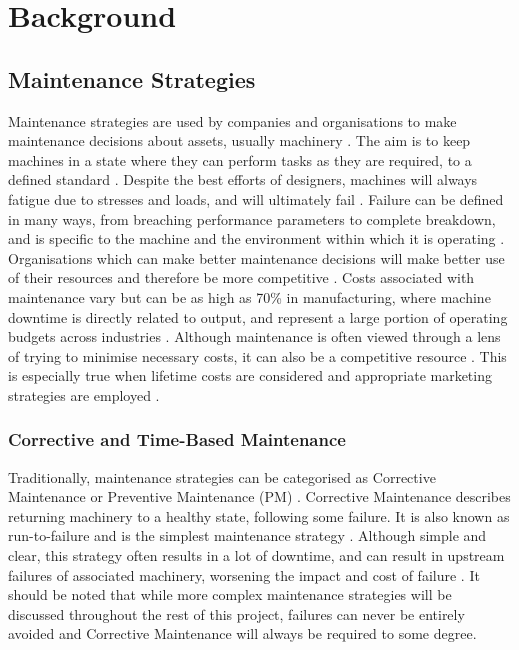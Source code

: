 
\chapter{Background}

\section{Maintenance Strategies}

Maintenance strategies are used by companies and organisations to make maintenance decisions about assets, usually machinery \cite{CBM_overview}.
The aim is to keep machines in a state where they can perform tasks as they are required, to a defined standard \cite{CBM_time_prevent}.
Despite the best efforts of designers, machines will always fatigue due to stresses and loads, and will ultimately fail \cite{CBM_overview}.
Failure can be defined in many ways, from breaching performance parameters to complete breakdown, and is specific to the machine and the environment within which it is operating \cite{CBM_overview}.
Organisations which can make better maintenance decisions will make better use of their resources and therefore be more competitive \cite{CBM_overview}.
Costs associated with maintenance vary but can be as high as 70\% in manufacturing, where machine downtime is directly related to output, and represent a large portion of operating budgets across industries \cite{COPM}.
Although maintenance is often viewed through a lens of trying to minimise necessary costs, it can also be a competitive resource \cite{COPM}.
This is especially true when lifetime costs are considered and appropriate marketing strategies are employed \cite{CBM_lifetime}.

\subsection{Corrective and Time-Based Maintenance}

Traditionally, maintenance strategies can be categorised as Corrective Maintenance or Preventive Maintenance (PM) \cite{CBM_time_prevent}.
Corrective Maintenance describes returning machinery to a healthy state, following some failure.
It is also known as run-to-failure and is the simplest maintenance strategy \cite{CBM_time_prevent}.
Although simple and clear, this strategy often results in a lot of downtime, and can result in upstream failures of associated machinery, worsening the impact and cost of failure \cite{CBM_overview}\cite{CM_randall}.
It should be noted that while more complex maintenance strategies will be discussed throughout the rest of this project, failures can never be entirely avoided and Corrective Maintenance will always be required to some degree.
\par

